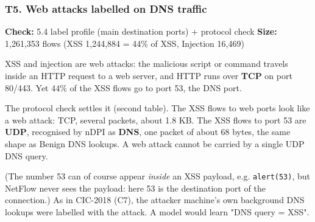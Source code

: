 \documentclass[10pt,a4paper]{article}
\newcommand{\meta}[2]{{\small\color{muted}\textbf{Check:} #1 \quad\textbar\quad \textbf{Size:} #2}}
\newenvironment{problem}{\par\noindent\begin{minipage}{\linewidth}\setlength{\parskip}{4pt}}{\end{minipage}\par\bigskip}
\begin{document}
\begin{problem}
\subsubsection*{T5. Web attacks labelled on DNS traffic}
\meta{5.4 label profile (main destination ports) + protocol check}{1,261,353 flows (XSS 1,244,884 = 44\% of XSS, Injection 16,469)}

XSS and injection are web attacks: the malicious script or command travels inside an HTTP request to a web server, and HTTP runs over \textbf{TCP} on port 80/443. Yet 44\% of the XSS flows go to port 53, the DNS port.

The protocol check settles it (second table). The XSS flows to web ports look like a web attack: TCP, several packets, about 1.8 KB. The XSS flows to port 53 are \textbf{UDP}, recognised by nDPI as \textbf{DNS}, one packet of about 68 bytes, the same shape as Benign DNS lookups. A web attack cannot be carried by a single UDP DNS query.

(The number 53 can of course appear \emph{inside} an XSS payload, e.g. \texttt{alert(53)}, but NetFlow never sees the payload: here 53 is the destination port of the connection.) As in CIC-2018 (C7), the attacker machine's own background DNS lookups were labelled with the attack. A model would learn "DNS query = XSS".


\end{problem}
\end{document}

